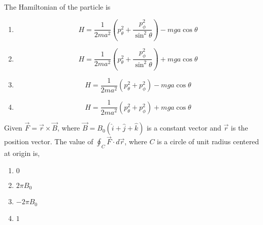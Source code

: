     The Hamiltonian of the particle is
    \begin{enumerate}
        \item 
        \begin{equation*}
        H = \frac{1}{2 m a^2} \left( p_{\theta}^2 + \frac{p_{\phi}^2}{\sin^2 \theta} \right) - m g a \cos \theta
        \end{equation*}
        \item 
        \begin{equation*}
        H = \frac{1}{2 m a^2} \left( p_{\theta}^2 + \frac{p_{\phi}^2}{\sin^2 \theta} \right) + m g a \cos \theta
        \end{equation*}
        \item 
        \begin{equation*}
        H = \frac{1}{2 m a^2} \left( p_{\theta}^2 + p_{\phi}^2 \right) - m g a \cos \theta
        \end{equation*}
        \item 
        \begin{equation*}
        H = \frac{1}{2 m a^2} \left( p_{\theta}^2 + p_{\phi}^2 \right) + m g a \cos \theta
        \end{equation*}
    \end{enumerate}

  

    \item Given $\vec{F} = \vec{r} \times \vec{B}$, where $\vec{B} = B_0 (\hat{i} + \hat{j} + \hat{k})$ is a constant vector and $\vec{r}$ is the position vector. The value of $\oint_C \vec{F} \cdot d\vec{r}$, where $C$ is a circle of unit radius centered at origin is,
   
\centering
{}%

\label{fig:my_label}

    \begin{enumerate}
        \item $0$
        \item $2 \pi B_0$
        \item $-2 \pi B_0$
        \item $1$
    \end{enumerate}

